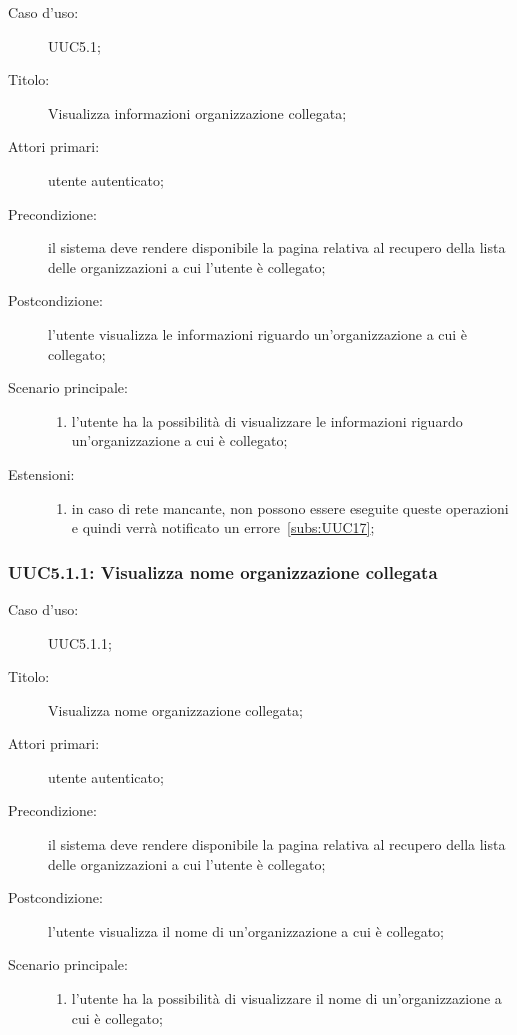 \documentclass[../../../analisi-dei-requisiti.tex]{subfiles}
\begin{document}
\begin{description}
  \item[Caso d'uso:] UUC5.1;
  \item[Titolo:] Visualizza informazioni organizzazione collegata;
  \item[Attori primari:] utente autenticato;
  \item[Precondizione:] il sistema deve rendere disponibile la pagina relativa al recupero della lista delle organizzazioni a cui l'utente è collegato;
  \item[Postcondizione:] l'utente visualizza le informazioni riguardo un'organizzazione a cui è collegato;
  \item[Scenario principale:]
        \begin{enumerate}
          \item l'utente ha la possibilità di visualizzare le informazioni riguardo un'organizzazione a cui è collegato;
        \end{enumerate}
  \item[Estensioni:]
        \begin{enumerate}
          \item in caso di rete mancante, non possono essere eseguite queste operazioni e quindi verrà notificato un errore~\ref{subs:UUC17};
        \end{enumerate}
\end{description}


\subsubsection{UUC5.1.1: Visualizza nome organizzazione collegata}%
\label{subs:UUC5.1.1}
\begin{description}
  \item[Caso d'uso:] UUC5.1.1;
  \item[Titolo:] Visualizza nome organizzazione collegata;
  \item[Attori primari:] utente autenticato;
  \item[Precondizione:] il sistema deve rendere disponibile la pagina relativa al recupero della lista delle organizzazioni a cui l'utente è collegato;
  \item[Postcondizione:] l'utente visualizza il nome di un'organizzazione a cui è collegato;
  \item[Scenario principale:]
        \begin{enumerate}
          \item l'utente ha la possibilità di visualizzare il nome di un'organizzazione a cui è collegato;
        \end{enumerate}
\end{description}
\end{document}
